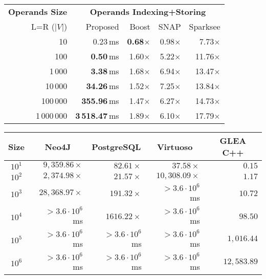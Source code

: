 \begin{multilucido}[GCEA]
	\begin{sottolucido}
		\begin{tabular}{r|r|rrr}
			\toprule
			\textbf{Operands Size} & \multicolumn{4}{c}{\textbf{Operands Indexing+Storing}}\\
			L=R ($|V|$)  &Proposed  & Boost  & SNAP  & Sparksee  \\
			\midrule
			10 &    0.23\,ms           & \textbf{0.68}$\times$ & 0.98$\times$ &  7.73$\times$\\
			100 &    \textbf{0.50}\,ms  & 1.60$\times$          & 5.22$\times$          & 11.76$\times$\\
			1\,000 &    \textbf{3.38}\,ms  & 1.68$\times$          & 6.94$\times$          & 13.47$\times$\\
			10\,000 &   \textbf{34.26}\,ms  & 1.52$\times$          & 7.25$\times$          & 13.84$\times$\\
			100\,000 &  \textbf{355.96}\,ms  & 1.47$\times$          & 6.27$\times$          & 14.73$\times$\\
			1\,000\,000 & \textbf{3\,518.47}\,ms  & 1.89$\times$          & 6.10$\times$          & 17.79$\times$\\
			\bottomrule
		\end{tabular}
	\end{sottolucido}
\end{multilucido}

\begin{multilucido}[GCLE]
	\begin{sottolucido}
			\begin{tabular}{crrrr}
			\toprule
			\multicolumn{1}{c}{Size}&\multicolumn{1}{c}{Neo4J}&\multicolumn{1}{c}{PostgreSQL}&\multicolumn{1}{c}{Virtuoso}&\multicolumn{1}{c}{\textbf{GLEA C++}}\\
			\midrule
			$10^1$&$ 9,359.86\times$&$  82.61\times$&$   37.58\times$&$    0.15$\\
			$10^2$&$ 2,374.98\times$&$  21.57\times$&$10,308.09\times$&$    1.17$\\
			$10^3$&$28,368.97\times$&$ 191.32\times$&$>3.6\cdot 10^6$ ms&$   10.72$\\
			$10^4$&$>3.6\cdot 10^6$ ms&$1616.22\times$&$>3.6\cdot 10^6$ ms&$   98.50$\\
			$10^5$&$>3.6\cdot 10^6$ ms&$>3.6\cdot 10^6$ ms&$>3.6\cdot 10^6$ ms&$ 1,016.44$\\
			$10^6$&$>3.6\cdot 10^6$ ms&$>3.6\cdot 10^6$ ms&$>3.6\cdot 10^6$ ms&$12,583.89$\\
			\bottomrule
		\end{tabular}
	\end{sottolucido}
\end{multilucido}